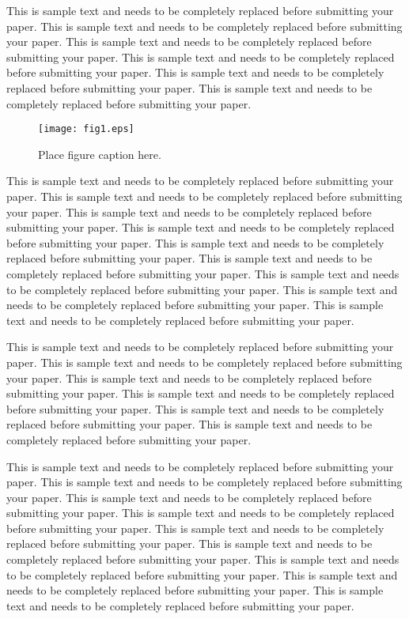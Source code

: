 \documentclass[11pt]{asaproc}
\begin{document}
This is sample text and needs to be completely replaced before submitting your paper. This is sample text and needs to be completely replaced before submitting your paper. This is sample text and needs to be completely replaced before submitting your paper. This is sample text and needs to be completely replaced before submitting your paper. This is sample text and needs to be completely replaced before submitting your paper. This is sample text and needs to be completely replaced before submitting your paper.

\begin{figure}[t]
\centering\texttt{[image: fig1.eps]}
\caption{Place figure caption here.}
\end{figure}

This is sample text and needs to be completely replaced before submitting your paper. This is sample text and needs to be completely replaced before submitting your paper. This is sample text and needs to be completely replaced before submitting your paper. This is sample text and needs to be completely replaced before submitting your paper. This is sample text and needs to be completely replaced before submitting your paper. This is sample text and needs to be completely replaced before submitting your paper. This is sample text and needs to be completely replaced before submitting your paper. This is sample text and needs to be completely replaced before submitting your paper. This is sample text and needs to be completely replaced before submitting your paper. 

This is sample text and needs to be completely replaced before submitting your paper. This is sample text and needs to be completely replaced before submitting your paper. This is sample text and needs to be completely replaced before submitting your paper. This is sample text and needs to be completely replaced before submitting your paper. This is sample text and needs to be completely replaced before submitting your paper. This is sample text and needs to be completely replaced before submitting your paper.

This is sample text and needs to be completely replaced before submitting your paper. This is sample text and needs to be completely replaced before submitting your paper. This is sample text and needs to be completely replaced before submitting your paper. This is sample text and needs to be completely replaced before submitting your paper. This is sample text and needs to be completely replaced before submitting your paper. This is sample text and needs to be completely replaced before submitting your paper. This is sample text and needs to be completely replaced before submitting your paper. This is sample text and needs to be completely replaced before submitting your paper. This is sample text and needs to be completely replaced before submitting your paper. 
\end{document}
